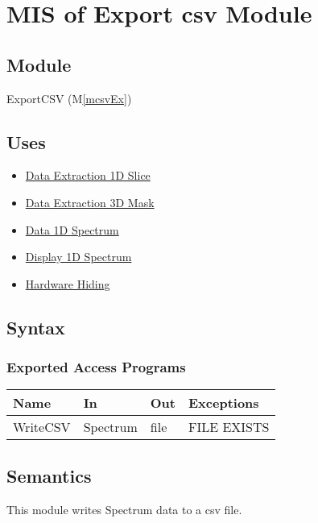 \documentclass[12pt, titlepage]{article}
\newcommand{\mref}[1]{M\ref{#1}}
\begin{document}
\section{MIS of Export csv Module} \label{Mod:ExportCSV}

\subsection{Module}

ExportCSV (\mref{mcsvEx})

\subsection{Uses}
\begin{itemize}
    \item \hyperref[Mod:Slice1D]{Data Extraction 1D Slice}
    \item \hyperref[Mod:Mask3D]{Data Extraction 3D Mask}
    \item \hyperref[Mod:Spectrum]{Data 1D Spectrum}
    \item \hyperref[Mod:Disp1D]{Display 1D Spectrum}
    \item \hyperref[Mod:HH]{Hardware Hiding}
\end{itemize}

\subsection{Syntax}

\subsubsection{Exported Access Programs}

\begin{center}
    \begin{tabular}{p{2cm} p{4cm} p{3cm} p{4cm}}
        \hline
        \textbf{Name} & \textbf{In} & \textbf{Out} & \textbf{Exceptions} \\
        \hline
        WriteCSV & Spectrum & file & FILE EXISTS \\
        \hline
    \end{tabular}
\end{center}

\subsection{Semantics}
This module writes Spectrum data to a csv file.
\end{document}
